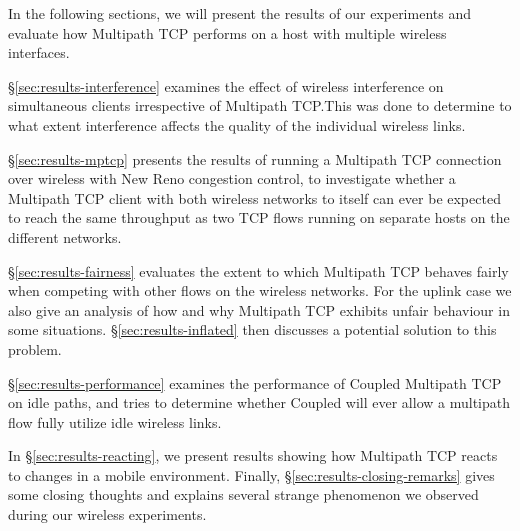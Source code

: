 In the following sections, we will present the results of our experiments and
evaluate how Multipath TCP performs on a host with multiple wireless
interfaces.

\S\ref{sec:results-interference} examines the effect of wireless
interference on simultaneous clients irrespective of Multipath TCP.\@ This was
done to determine to what extent interference affects the quality of the
individual wireless links.

\S\ref{sec:results-mptcp} presents the results of running a Multipath TCP
connection over wireless with New Reno congestion control, to investigate whether
a Multipath TCP client with both wireless networks to
itself can ever be expected to reach the same throughput as two TCP flows running on
separate hosts on the different networks.

\S\ref{sec:results-fairness} evaluates the extent to which Multipath TCP behaves
fairly when competing with other flows on the wireless networks. For the uplink
case we also give an analysis of how and why Multipath TCP exhibits unfair
behaviour in some situations. \S\ref{sec:results-inflated} then discusses a
potential solution to this problem.

\S\ref{sec:results-performance} examines the performance of Coupled Multipath
TCP on idle paths, and tries to determine whether Coupled will ever allow a
multipath flow fully utilize idle wireless links.

In \S\ref{sec:results-reacting}, we present results showing how Multipath TCP
reacts to changes in a mobile environment. Finally,
\S\ref{sec:results-closing-remarks} gives some closing thoughts and explains
several strange phenomenon we observed during our wireless experiments.
